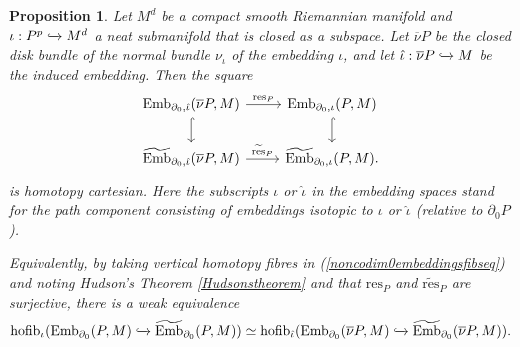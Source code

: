 \documentclass[a4paper, oneside]{amsart}
\newcommand{\emb}{\operatorname{Emb}}
\newcommand{\bemb}{\widetilde{\operatorname{Emb}}}
\newcommand{\hofib}{\operatorname{hofib}}
\newcommand{\1}{\mathds{1}}
\newtheorem{prop}[thm]{Proposition}
\theoremstyle{remark}
\theoremstyle{definition}
\numberwithin{equation}{section}
\begin{document}
\begin{prop}\label{positivecodimprop}
Let $M^d$ be a compact smooth Riemannian manifold and $\iota: P^p\xhookrightarrow{} M^d$ a neat submanifold that is closed as a subspace. Let $\overline{\nu}P$ be the closed disk bundle of the normal bundle $\nu_\iota$ of the embedding $\iota$, and let $\hat\iota: \overline{\nu}P\xhookrightarrow{} M$ be the induced embedding. Then the square
\begin{equation}\label{noncodim0embeddingsfibseq}
\begin{tikzcd}
    \emb_{\partial_0,\hat\iota}(\overline{\nu}P,M)\rar["\mathrm{res}_P"]\dar[hook] & \emb_{\partial_0,\iota}(P,M)\dar[hook]\\
    \bemb_{\partial_0,\hat\iota}(\overline{\nu}P,M)\rar["\widetilde{\mathrm{res}}_P"] &\bemb_{\partial_0,\iota}(P,M).
\end{tikzcd}
\end{equation}
is homotopy cartesian. Here the subscripts $\iota$ or $\hat\iota$ in the embedding spaces stand for the path component consisting of embeddings isotopic to $\iota$ or $\hat\iota$ (relative to $\partial_0P$).

Equivalently, by taking vertical homotopy fibres in (\ref{noncodim0embeddingsfibseq}) and noting Hudson's Theorem \ref{Hudsonstheorem} and that $\mathrm{res}_P$ and $\widetilde{\mathrm{res}}_P$ are surjective, there is a weak equivalence
$$
\hofib_\iota(\emb_{\partial_0}(P,M)\xhookrightarrow{}\bemb_{\partial_0}(P,M))\simeq \hofib_{\hat\iota}(\emb_{\partial_0}(\overline{\nu}P,M)\xhookrightarrow{}\bemb_{\partial_0}(\overline{\nu}P,M)).
$$
\end{prop}
\end{document}
